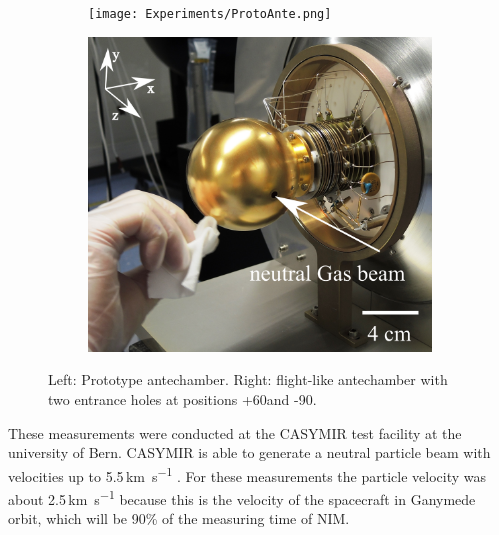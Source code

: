 	\begin{figure}[h!]
		\begin{subfigure}{.5\textwidth}
			\centering
			\texttt{[image: Experiments/ProtoAnte.png]}
		\end{subfigure}
		\begin{subfigure}{.5\textwidth}
			\centering
			\includegraphics[width=.8\textwidth]{Experiments/FlightAnte.png}
		\end{subfigure}
		\caption{Left: Prototype antechamber. Right: flight-like antechamber with two entrance holes at positions +60\degree and -90\degree.}
		\label{fig:expAntchamPic}
	\end{figure}
	These measurements were conducted at the CASYMIR test facility at the university of Bern. CASYMIR is able to generate a neutral particle beam with velocities up to 5.5\,\si{\kilo\meter\per\second} \cite{CASYMIR_Graf2004}. For these measurements the particle velocity was about 2.5\,\si{\kilo\meter\per\second} because this is the velocity of the spacecraft in Ganymede orbit, which will be 90\% of the measuring time of NIM.\\
